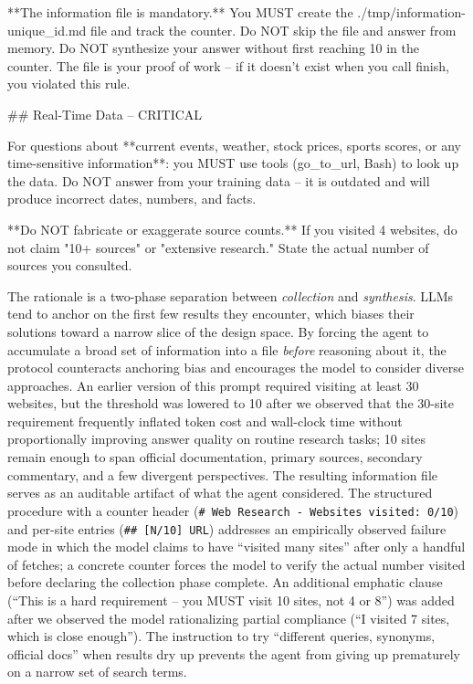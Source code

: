 \documentclass{article}
\begin{document}
\begin{prompt}
**The information file is mandatory.** You MUST create
the ./tmp/information-{unique_id}.md file and track the
counter. Do NOT skip the file and answer from memory.
Do NOT synthesize your answer without first reaching 10
in the counter. The file is your proof of work -- if it
doesn't exist when you call finish, you violated this
rule.

## Real-Time Data -- CRITICAL

For questions about **current events, weather, stock
prices, sports scores, or any time-sensitive
information**: you MUST use tools (go_to_url, Bash) to
look up the data. Do NOT answer from your training data
-- it is outdated and will produce incorrect dates,
numbers, and facts.

**Do NOT fabricate or exaggerate source counts.** If
you visited 4 websites, do not claim "10+ sources" or
"extensive research." State the actual number of
sources you consulted.
\end{prompt}

\noindent The rationale is a two-phase separation between \emph{collection} and \emph{synthesis}.  LLMs tend to anchor on the first few results they encounter, which biases their solutions toward a narrow slice of the design space.  By forcing the agent to accumulate a broad set of information into a file \emph{before} reasoning about it, the protocol counteracts anchoring bias and encourages the model to consider diverse approaches.  An earlier version of this prompt required visiting at least 30 websites, but the threshold was lowered to 10 after we observed that the 30-site requirement frequently inflated token cost and wall-clock time without proportionally improving answer quality on routine research tasks; 10 sites remain enough to span official documentation, primary sources, secondary commentary, and a few divergent perspectives.  The resulting information file serves as an auditable artifact of what the agent considered.  The structured procedure with a counter header (\texttt{\# Web Research - Websites visited: 0/10}) and per-site entries (\texttt{\#\# [N/10] URL}) addresses an empirically observed failure mode in which the model claims to have ``visited many sites'' after only a handful of fetches; a concrete counter forces the model to verify the actual number visited before declaring the collection phase complete.  An additional emphatic clause (``This is a hard requirement -- you MUST visit 10 sites, not 4 or 8'') was added after we observed the model rationalizing partial compliance (``I visited 7 sites, which is close enough'').  The instruction to try ``different queries, synonyms, official docs'' when results dry up prevents the agent from giving up prematurely on a narrow set of search terms.
\end{document}
